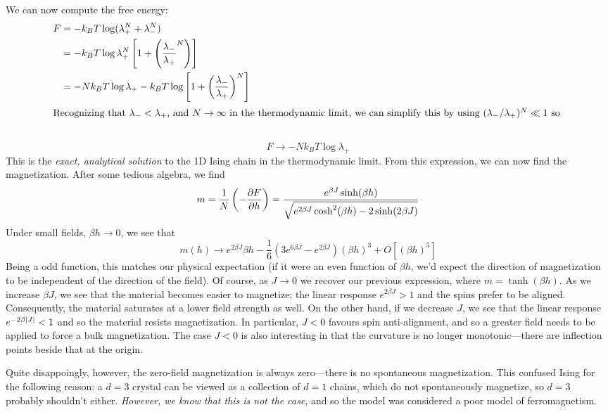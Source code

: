 We can now compute the free energy:
\begin{align*}
	F&=-k_BT\log(\lambda_+^N+\lambda_-^N)\\
	 &=-k_BT\log\lambda_+^N\left[1+\left(\frac{\lambda_-}{\lambda_+}^N\right)\right]\\
	 &=-Nk_BT\log\lambda_+ -k_BT\log\left[1+\left(\frac{\lambda_-}{\lambda_+}\right)^N\right]\\
	 \intertext{Recognizing that \(\lambda_-<\lambda_+\), and \(N\to\infty\) in the thermodynamic limit, we can simplify this by using \((\lambda_-/\lambda_+)^N\ll1\) so }\\
\end{align*}
\begin{equation}
	F\to -Nk_BT\log\lambda_+
\end{equation}
This is the \emph{exact, analytical solution} to the 1D Ising chain in the thermodynamic limit. From this expression, we can now find the magnetization. After some tedious algebra, we find
\begin{equation}
	m = \frac{1}{N}\left(-\pder{F}{h}\right) = \frac{e^{\beta J}\sinh(\beta h)}{\sqrt{e^{2\beta J}\cosh^2(\beta h)-2\sinh(2\beta J)}}
\end{equation}
Under small fields, \(\beta h\to 0\), we see that
\[m(h)\to e^{2\beta J}\beta h - \frac{1}{6}\left(3e^{6\beta J}-e^{2\beta J}\right)(\beta h)^3+O[(\beta h)^5]\]
Being a odd function, this matches our physical expectation (if it were an even function of \(\beta h\), we'd expect the direction of magnetization to be independent of the direction of the field). Of course, as \(J\to 0\) we recover our previous expression, where \(m=\tanh(\beta h)\). As we increase \(\beta J\), we see that the material becomes easier to magnetize; the linear response \(e^{2\beta J}>1\) and the spins prefer to be aligned. Consequently, the material saturates at a lower field strength as well. On the other hand, if we decrease \(J\), we see that the linear response \(e^{-2\beta\abs{J}}<1\) and so the material resists magnetization. In particular, \(J<0\) favours spin anti-alignment, and so a greater field needs to be applied to force a bulk magnetization. The case \(J<0\) is also interesting in that the curvature is no longer monotonic---there are inflection points beside that at the origin.

\diagram{}

Quite disappoingly, however, the zero-field magnetization is always zero---there is no spontaneous magnetization. This confused Ising for the following reason: a \(d=3\) crystal can be viewed as a collection of \(d=1\) chains, which do not spontaneously magnetize, so \(d=3\) probably shouldn't either. \emph{However, we know that this is not the case}, and so the model was considered a poor model of ferromagnetism. 

